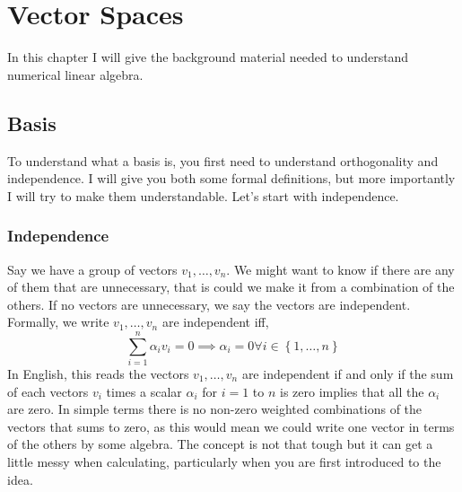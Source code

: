 \chapter{Vector Spaces}

In this chapter I will give the background material needed to understand numerical linear algebra.

\section{Basis}\label{s-basis}
To understand what a basis is, you first need to understand orthogonality and independence.  I will give you both some formal definitions, but more importantly I will try to make them understandable.  Let's start with independence.

\subsection{Independence}
Say we have a group of vectors $v_1, \ldots, v_n$.  We might want to know if there are any of them that are unnecessary, that is could we make it from a combination of the others.  If no vectors are unnecessary, we say the vectors are independent.  Formally, we write $v_1, \ldots, v_n$ are independent iff,
\begin{equation}
\sum_{i=1}^n\alpha_iv_i=0 \implies \alpha_i=0 \forall i\in\left\{1, \ldots, n\right\}
\end{equation}
In English, this reads the vectors $v_1, \ldots, v_n$ are independent if and only if the sum of each vectors $v_i$ times a scalar $\alpha_i$ for $i=1$ to $n$ is zero implies that all the $\alpha_i$ are zero.  In simple terms there is no non-zero weighted combinations of the vectors that sums to zero, as this would mean we could write one vector in terms of the others by some algebra.  The concept is not that tough but it can get a little messy when calculating, particularly when you are first introduced to the idea.

